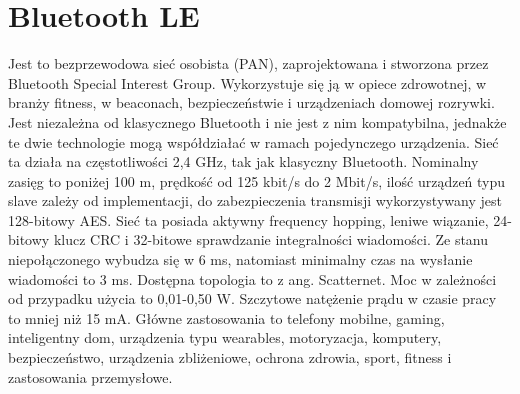 \section{Bluetooth LE}
Jest to bezprzewodowa sieć osobista (PAN), zaprojektowana i stworzona przez Bluetooth Special Interest Group. Wykorzystuje się ją w opiece zdrowotnej, w branży fitness, w beaconach, bezpieczeństwie i urządzeniach domowej rozrywki. Jest niezależna od klasycznego Bluetooth i nie jest z nim kompatybilna, jednakże te dwie technologie mogą współdziałać w ramach pojedynczego urządzenia.
Sieć ta działa na częstotliwości 2,4 GHz, tak jak klasyczny Bluetooth.
Nominalny zasięg to poniżej 100 m, prędkość od 125 kbit/s do 2 Mbit/s, ilość urządzeń typu slave zależy od implementacji, do zabezpieczenia transmisji wykorzystywany jest 128-bitowy AES.
Sieć ta posiada aktywny frequency hopping, leniwe wiązanie, 24-bitowy klucz CRC i 32-bitowe sprawdzanie integralności wiadomości.
Ze stanu niepołączonego wybudza się w 6 ms, natomiast minimalny czas na wysłanie wiadomości to 3 ms.
Dostępna topologia to z ang. Scatternet.
Moc w zależności od przypadku użycia to 0,01-0,50 W.
Szczytowe natężenie prądu w czasie pracy to mniej niż 15 mA.
Główne zastosowania to telefony mobilne, gaming, inteligentny dom, urządzenia typu wearables, motoryzacja, komputery, bezpieczeństwo, urządzenia zbliżeniowe, ochrona zdrowia, sport, fitness i zastosowania przemysłowe.\cite{Wikipedia:ble:2024}